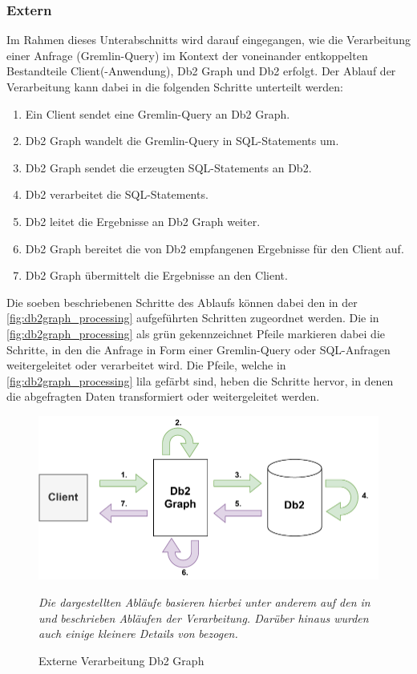 \subsubsection{Extern}
Im Rahmen dieses Unterabschnitts wird darauf eingegangen, wie die Verarbeitung einer Anfrage (Gremlin-Query) im Kontext der voneinander entkoppelten Bestandteile Client(-Anwendung), Db2 Graph und Db2 erfolgt. Der Ablauf der Verarbeitung kann dabei in die folgenden Schritte unterteilt werden: 
\begin{enumerate}
    \item Ein Client sendet eine Gremlin-Query an Db2 Graph. 
    \item Db2 Graph wandelt die Gremlin-Query in SQL-Statements um. 
    \item Db2 Graph sendet die erzeugten SQL-Statements an Db2.
    \item Db2 verarbeitet die SQL-Statements.
    \item Db2 leitet die Ergebnisse an Db2 Graph weiter.
    \item Db2 Graph bereitet die von Db2 empfangenen Ergebnisse für den Client auf. 
    \item Db2 Graph übermittelt die Ergebnisse an den Client.
\end{enumerate}

Die soeben beschriebenen Schritte des Ablaufs können dabei den in der \autoref{fig:db2graph_processing} aufgeführten Schritten zugeordnet werden. Die in \autoref{fig:db2graph_processing} als grün gekennzeichnet Pfeile markieren dabei die Schritte, in den die Anfrage in Form einer Gremlin-Query oder SQL-Anfragen weitergeleitet oder verarbeitet wird. Die Pfeile, welche in \autoref{fig:db2graph_processing} lila gefärbt sind, heben die Schritte hervor, in denen die abgefragten Daten transformiert oder weitergeleitet werden.

\begin{figure}[ht]
    \centering
    \includegraphics[width=\textwidth]{images/db2graph_processing.pdf}
    \caption{Externe Verarbeitung Db2 Graph}
    \label{fig:db2graph_processing}
    \vspace{1em}
    \textit{Die dargestellten Abläufe basieren hierbei unter anderem auf den in} \cite{vldb_tian} \textit{und} \cite{sigmod_tian} \textit{beschrieben Abläufen der Verarbeitung. Darüber hinaus wurden auch einige kleinere Details von} \cite{tinkerpop_2020} \textit{bezogen.} 
\end{figure}

